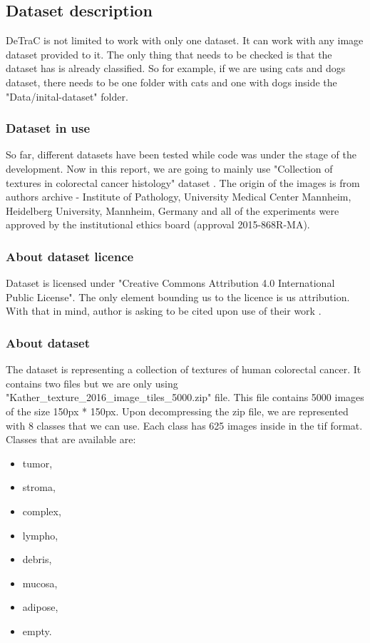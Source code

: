 \subsection{Dataset description}

DeTraC is not limited to work with only one dataset. It can work with any image dataset provided to it. The only thing that needs to be checked is that the dataset has is already classified. So for example, if we are using cats and dogs dataset, there needs to be one folder with cats and one with dogs inside the "Data/inital-dataset" folder.

\subsubsection{Dataset in use}
So far, different datasets have been tested while code was under the stage of the development. Now in this report, we are going to mainly use "Collection of textures in colorectal cancer histology" dataset \parencite{kather_2016_53169}.
\newline
The origin of the images is from authors archive - Institute of Pathology, University Medical Center Mannheim, Heidelberg University, Mannheim, Germany and all of the experiments were approved by the institutional ethics board (approval 2015-868R-MA).

\subsubsection{About dataset licence}
Dataset is licensed under "Creative Commons Attribution 4.0 International Public License". The only element bounding us to the licence is us attribution. With that in mind, author is asking to be cited upon use of their work \parencite{web:licenseInfo}. 

\subsubsection{About dataset}
The dataset is representing a collection of textures of human colorectal cancer. It contains two files but we are only using "Kather{\_}texture{\_}2016{\_}image{\_}tiles{\_}5000.zip" file. This file contains 5000 images of the size 150px * 150px.
\newline
Upon decompressing the zip file, we are represented with 8 classes that we can use. Each class has 625 images inside in the tif format.
Classes that are available are:
\begin{itemize}
  \item tumor,
  \item stroma,
  \item complex,
  \item lympho,
  \item debris,
  \item mucosa,
  \item adipose,
  \item empty.
\end{itemize}